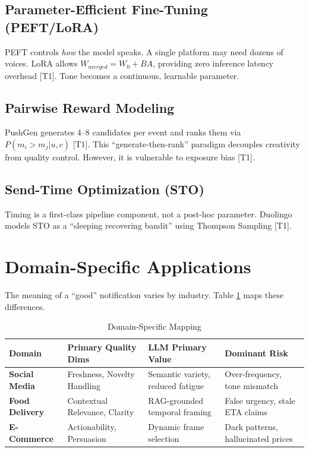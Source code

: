 \documentclass[sigconf]{acmart}
\begin{document}
\subsection{Parameter-Efficient Fine-Tuning (PEFT/LoRA)}
PEFT controls \textit{how} the model speaks. A single platform may need dozens of voices. LoRA allows $W_{merged} = W_0 + BA$, providing zero inference latency overhead \cite{hu2022lora, han2024parameter} [T1]. Tone becomes a continuous, learnable parameter.

\subsection{Pairwise Reward Modeling}
PushGen generates 4--8 candidates per event and ranks them via $P(m_i > m_j | u, c)$ \cite{bie2026pushgen} [T1]. This ``generate-then-rank'' paradigm decouples creativity from quality control. However, it is vulnerable to exposure bias \cite{joachims2018deep} [T1].

\subsection{Send-Time Optimization (STO)}
Timing is a first-class pipeline component, not a post-hoc parameter. Duolingo models STO as a ``sleeping recovering bandit'' using Thompson Sampling \cite{yancey2020sleeping} [T1].

\section{Domain-Specific Applications}

The meaning of a ``good'' notification varies by industry. Table \ref{tab:domain} maps these differences.

\begin{table}[t]
\caption{Domain-Specific Mapping}
\label{tab:domain}
\begin{tabular}{p{2.5cm}p{4cm}p{4cm}p{4cm}}
\toprule
\textbf{Domain} & \textbf{Primary Quality Dims} & \textbf{LLM Primary Value} & \textbf{Dominant Risk} \\
\midrule
\textbf{Social Media} & Freshness, Novelty Handling & Semantic variety, reduced fatigue & Over-frequency, tone mismatch \\
\textbf{Food Delivery} & Contextual Relevance, Clarity & RAG-grounded temporal framing & False urgency, stale ETA claims \\
\textbf{E-Commerce} & Actionability, Persuasion & Dynamic frame selection & Dark patterns, hallucinated prices \\
\bottomrule
\end{tabular}
\end{table}
\end{document}
